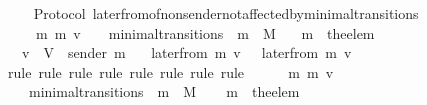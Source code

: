 \begin{isabellebody}
%
\isadelimproof
\ \ %
\endisadelimproof
%
\isatagproof
{}\isamarkupfalse%
%
\endisatagproof
{\isafoldproof}%
%
\isadelimproof
\isanewline
%
\endisadelimproof
\isanewline
\isanewline
\isanewline
\isanewline
{}\isamarkupfalse%
\ {\isacharparenleft}\ Protocol{\isacharparenright}\ later{\isacharunderscore}from{\isacharunderscore}of{\isacharunderscore}non{\isacharunderscore}sender{\isacharunderscore}not{\isacharunderscore}affected{\isacharunderscore}by{\isacharunderscore}minimal{\isacharunderscore}transitions\ {\isacharcolon}\isanewline
\ \ {\isachardoublequoteopen}{\isasymforall}\ {\isasymsigma}\ {\isasymsigma}{\isacharprime}\ m\ m{\isacharprime}\ v{\isachardot}\ {\isacharparenleft}{\isasymsigma}{\isacharcomma}\ {\isasymsigma}{\isacharprime}{\isacharparenright}\ {\isasymin}\ minimal{\isacharunderscore}transitions\ {\isasymand}\ m\ {\isasymin}\ M\isanewline
\ \ {\isasymlongrightarrow}\ m{\isacharprime}\ {\isacharequal}\ the{\isacharunderscore}elem\ {\isacharparenleft}{\isasymsigma}{\isacharprime}\ {\isacharminus}\ {\isasymsigma}{\isacharparenright}\isanewline
\ \ {\isasymlongrightarrow}\ v\ {\isasymin}\ V\ {\isacharminus}\ {\isacharbraceleft}sender\ m{\isacharprime}{\isacharbraceright}\isanewline
\ \ {\isasymlongrightarrow}\ later{\isacharunderscore}from\ {\isacharparenleft}m{\isacharcomma}\ v{\isacharcomma}\ {\isasymsigma}{\isacharparenright}\ {\isacharequal}\ later{\isacharunderscore}from\ {\isacharparenleft}m{\isacharcomma}\ v{\isacharcomma}\ {\isasymsigma}{\isacharprime}{\isacharparenright}{\isachardoublequoteclose}\isanewline
%
\isadelimproof
\ \ %
\endisadelimproof
%
\isatagproof
{}\isamarkupfalse%
\ {\isacharparenleft}rule{\isacharcomma}\ rule{\isacharcomma}\ rule{\isacharcomma}\ rule{\isacharcomma}\ rule{\isacharcomma}\ rule{\isacharcomma}\ rule{\isacharcomma}\ rule{\isacharparenright}\isanewline
{}\isamarkupfalse%
{\isacharminus}\isanewline
\ \ \isamarkupfalse%
\ {\isasymsigma}\ {\isasymsigma}{\isacharprime}\ m\ m{\isacharprime}\ v\isanewline
\ \ \isamarkupfalse%
\ {\isachardoublequoteopen}{\isacharparenleft}{\isasymsigma}{\isacharcomma}\ {\isasymsigma}{\isacharprime}{\isacharparenright}\ {\isasymin}\ minimal{\isacharunderscore}transitions\ {\isasymand}\ m\ {\isasymin}\ M{\isachardoublequoteclose}\isanewline
\ \ \isamarkupfalse%
\ {\isachardoublequoteopen}m{\isacharprime}\ {\isacharequal}\ the{\isacharunderscore}elem\ {\isacharparenleft}{\isasymsigma}{\isacharprime}\ {\isacharminus}\ {\isasymsigma}{\isacharparenright}{\isachardoublequoteclose}\isanewline

\end{isabellebody}
